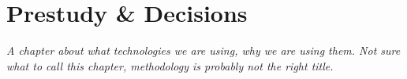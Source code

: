 
\chapter{Prestudy \& Decisions}

\textit{A chapter about what technologies we are using, why we are using them.
Not sure what to call this chapter, methodology is probably not the right title.}

\cleardoublepage